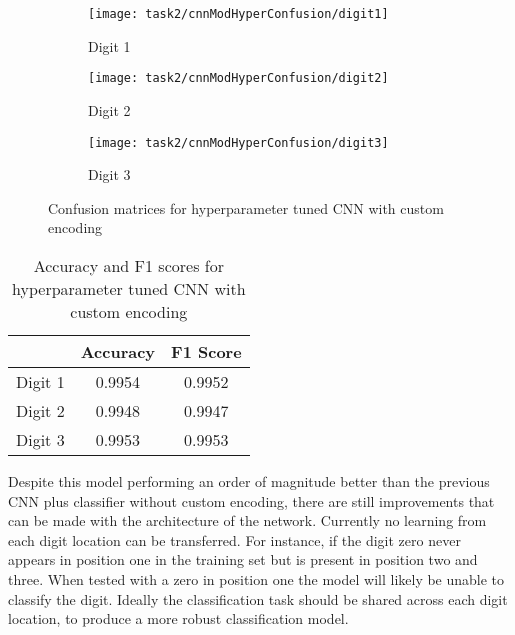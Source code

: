 \begin{figure}[!htbp]
    \centering
    \begin{subfigure}{0.3\textwidth}
        \texttt{[image: task2/cnnModHyperConfusion/digit1]}
        \caption{Digit 1}
        \label{fig:cnnModHyperConfusionMatrix1}
    \end{subfigure}
    \begin{subfigure}{0.3\textwidth}
        \texttt{[image: task2/cnnModHyperConfusion/digit2]}
        \caption{Digit 2}
        \label{fig:cnnModHyperConfusionMatrix2}
    \end{subfigure}
    \begin{subfigure}{0.3\textwidth}
        \texttt{[image: task2/cnnModHyperConfusion/digit3]}
        \caption{Digit 3}
        \label{fig:cnnModHyperConfusionMatrix3}
    \end{subfigure}
    \caption{Confusion matrices for hyperparameter tuned CNN with custom encoding}
    \label{fig:cnnModHyperConfusionMatrix}
\end{figure}

\bgroup
    \begin{table}[!htbp]
        \centering
        \begin{tabular}{l|cc}
            \hline
            & Accuracy & F1 Score \\ \hline
            Digit 1 & 0.9954 & 0.9952 \\
            Digit 2 & 0.9948 & 0.9947 \\ 
            Digit 3 & 0.9953 & 0.9953 \\
        \end{tabular}
        \caption{Accuracy and F1 scores for hyperparameter tuned CNN with custom encoding}
        \label{tbl:accuracyCNNModHyper}
    \end{table}
\egroup

Despite this model performing an order of magnitude better than the previous CNN plus classifier without custom encoding, there are still improvements that can be made with the architecture of the network. Currently no learning from each digit location can be transferred. For instance, if the digit zero never appears in position one in the training set but is present in position two and three. When tested with a zero in position one the model will likely be unable to classify the digit. Ideally the classification task should be shared across each digit location, to produce a more robust classification model.

